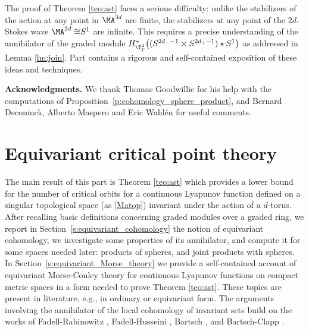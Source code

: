 \documentclass[11pt,a4paper,reqno]{article}
\numberwithin{equation}{section}
\theoremstyle{definition}
\begin{document}
The proof of Theorem 
\ref{teo:ast} faces a serious difficulty: unlike the stabilizers of the action at any point in
 $\MA^{3d}$ are finite, the stabilizers at any point of the $ 2d $-Stokes wave  $ {\MA^{2d}\cong} S^1 $
  are infinite.
This requires a precise 
understanding of the annihilator of the graded 
module $H^*_{\T^2_\Gamma}\big
((S^{2d_- -1} \times 
S^{2d_+-1})\star S^1\big) $
as addressed in 
 Lemma \ref{lm:join}. 
Part \ref{part:equivariant_critical_point_theory} 
contains  a rigorous and self-contained exposition of these ideas  and techniques.  

 \medskip
\noindent 
{\bf Acknowledgments.}  
We thank Thomas Goodwillie for his help with the 
computations of Proposition~\ref{p:cohomology_sphere_product}, and Bernard Deconinck, Alberto Maspero  
and Eric Wahl\'en  for useful comments. 

\part{Equivariant critical point theory}
\label{part:equivariant_critical_point_theory}

The main result of this part is Theorem \ref{teo:ast} which provides a lower bound for the number of critical orbits for a continuous Lyapunov function defined on a 
singular 
topological space
(as \eqref{Matop}) 
invariant under the action of a $d$-torus.
After  recalling basic definitions concerning graded modules over a graded ring, 
we report 
in Section~\ref{s:equivariant_cohomology}   the notion of equivariant cohomology, we investigate some properties of its annihilator, and compute it for some spaces 
 needed later:  
 products of spheres, and joint products with spheres. In Section~\ref{s:equivariant_Morse_theory} we provide a self-contained account of %
 equivariant Morse-Conley theory for continuous Lyapunov functions on compact metric spaces in a form needed to prove Theorem \ref{teo:ast}. These topics are present in literature, e.g.,   \cite{Morse:1996aa, Milnor:1974aa,Atiyah:1983aa,Conley:1978aa,Benci1991,Salamon1985} in ordinary or equivariant form. The arguments involving the annihilator of the local cohomology of invariant sets build on the works of Fadell-Rabinowitz 
\cite{FR}, Fadell-Husseini \cite{Fadell:1988aa}, Bartsch 
\cite{Bart1}, and Bartsch-Clapp \cite{Bartsch:1990aa}.\vspace{7pt}
\end{document}
